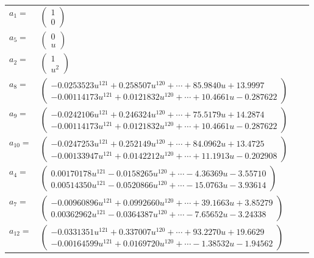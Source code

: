 \documentclass[1p]{elsarticle_modified}
\theoremstyle{definition}
\begin{document}
\begin{tabular}{m{7pt} m{180pt} m{7pt} m{180pt} }
\flushright $a_{1}=$&$\begin{pmatrix}1\\0\end{pmatrix}$ \\
\flushright $a_{5}=$&$\begin{pmatrix}0\\u\end{pmatrix}$ \\
\flushright $a_{2}=$&$\begin{pmatrix}1\\u^2\end{pmatrix}$ \\
\flushright $a_{8}=$&$\begin{pmatrix}-0.0253523 u^{121}+0.258507 u^{120}+\cdots+85.9840 u+13.9997\\-0.00114173 u^{121}+0.0121832 u^{120}+\cdots+10.4661 u-0.287622\end{pmatrix}$ \\
\flushright $a_{9}=$&$\begin{pmatrix}-0.0242106 u^{121}+0.246324 u^{120}+\cdots+75.5179 u+14.2874\\-0.00114173 u^{121}+0.0121832 u^{120}+\cdots+10.4661 u-0.287622\end{pmatrix}$ \\
\flushright $a_{10}=$&$\begin{pmatrix}-0.0247253 u^{121}+0.252149 u^{120}+\cdots+84.0962 u+13.4725\\-0.00133947 u^{121}+0.0142212 u^{120}+\cdots+11.1913 u-0.202908\end{pmatrix}$ \\
\flushright $a_{4}=$&$\begin{pmatrix}0.00170178 u^{121}-0.0158265 u^{120}+\cdots-4.36369 u-3.55710\\0.00514350 u^{121}-0.0520866 u^{120}+\cdots-15.0763 u-3.93614\end{pmatrix}$ \\
\flushright $a_{7}=$&$\begin{pmatrix}-0.00960896 u^{121}+0.0992660 u^{120}+\cdots+39.1663 u+3.85279\\0.00362962 u^{121}-0.0364387 u^{120}+\cdots-7.65652 u-3.24338\end{pmatrix}$ \\
\flushright $a_{12}=$&$\begin{pmatrix}-0.0331351 u^{121}+0.337007 u^{120}+\cdots+93.2270 u+19.6629\\-0.00164599 u^{121}+0.0169720 u^{120}+\cdots-1.38532 u-1.94562\end{pmatrix}$ \\

\end{tabular}
\end{document}

